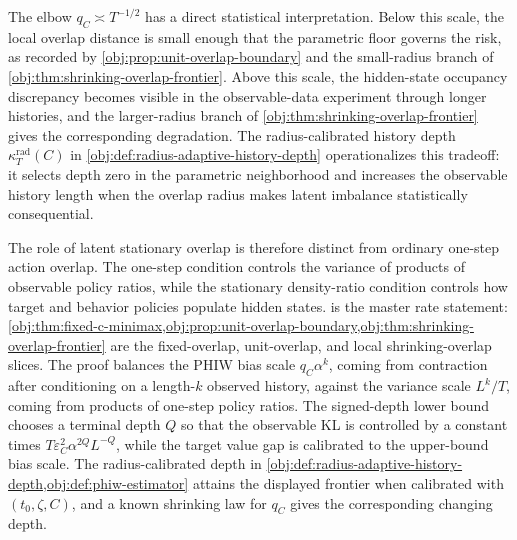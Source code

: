 \documentclass[11pt]{article}
\begin{document}
The elbow \(q_C\asymp T^{-1/2}\) has a direct statistical interpretation. Below this scale, the local overlap distance is small enough that the parametric floor governs the risk, as recorded by \cref{obj:prop:unit-overlap-boundary} and the small-radius branch of \cref{obj:thm:shrinking-overlap-frontier}. Above this scale, the hidden-state occupancy discrepancy becomes visible in the observable-data experiment through longer histories, and the larger-radius branch of \cref{obj:thm:shrinking-overlap-frontier} gives the corresponding degradation. The radius-calibrated history depth \(\kappa_T^{\mathrm{rad}}(C)\) in \cref{obj:def:radius-adaptive-history-depth} operationalizes this tradeoff: it selects depth zero in the parametric neighborhood and increases the observable history length when the overlap radius makes latent imbalance statistically consequential.

The role of latent stationary overlap is therefore distinct from ordinary one-step action overlap. The one-step condition controls the variance of products of observable policy ratios, while the stationary density-ratio condition controls how target and behavior policies populate hidden states.  is the master rate statement: \cref{obj:thm:fixed-c-minimax,obj:prop:unit-overlap-boundary,obj:thm:shrinking-overlap-frontier} are the fixed-overlap, unit-overlap, and local shrinking-overlap slices. The proof balances the PHIW bias scale \(q_C\alpha^k\), coming from contraction after conditioning on a length-\(k\) observed history, against the variance scale \(L^k/T\), coming from products of one-step policy ratios. The signed-depth lower bound chooses a terminal depth \(Q\) so that the observable KL is controlled by a constant times \(T\varepsilon_C^2\alpha^{2Q}L^{-Q}\), while the target value gap is calibrated to the upper-bound bias scale. The radius-calibrated depth in \cref{obj:def:radius-adaptive-history-depth,obj:def:phiw-estimator} attains the displayed frontier when calibrated with \((t_0,\zeta,C)\), and a known shrinking law for \(q_C\) gives the corresponding changing depth.
\end{document}

